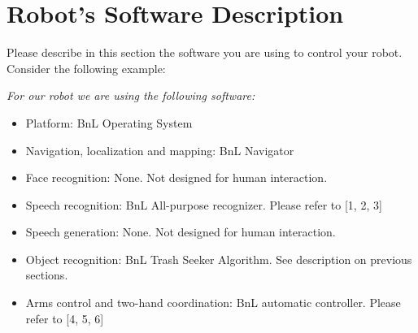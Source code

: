 \section*{Robot's Software Description}
Please describe in this section the software you are using to control your robot.
Consider the following example:

\textit{For our robot we are using the following software:}

\begin{itemize}
	\item Platform: BnL Operating System
	\item Navigation, localization and mapping: BnL Navigator
	\item Face recognition: None. Not designed for human interaction.
	\item Speech recognition: BnL All-purpose recognizer. Please refer to [1, 2, 3]
	\item Speech generation: None. Not designed for human interaction.
	\item Object recognition: BnL Trash Seeker Algorithm. See description on previous sections.
	\item Arms control and two-hand coordination: BnL automatic controller. Please refer to [4, 5, 6]
\end{itemize}